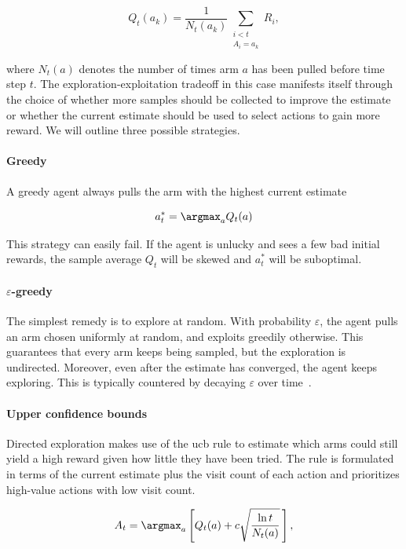 \begin{equation}\label{eq:bandit-sample-average}
  Q_t(a_k)=\frac{1}{N_t(a_k)}\sum_{\substack{i<t\\A_i=a_k}}R_i,
\end{equation}

where $N_t(a)$ denotes the number of times arm $a$ has been pulled before time step $t$.
The exploration-exploitation tradeoff in this case manifests itself through the choice
of whether more samples should be collected to improve the estimate or whether
the current estimate should be used to select actions to gain more reward.
We will outline three possible strategies.

\paragraph{Greedy}

A greedy agent always pulls the arm with the highest current estimate

\[
  a_t^*=\argmax_{a} Q_t(a)
\]

This strategy can easily fail.
If the agent is unlucky and sees a few bad initial rewards, the sample average $Q_t$ will be skewed and $a_t^*$ will be suboptimal.

\paragraph{$\varepsilon$-greedy}
The simplest remedy is to explore at random.
With probability $\varepsilon$, the agent pulls an arm chosen uniformly at random, and exploits greedily otherwise.
This guarantees that every arm keeps being sampled, but the exploration is undirected.
Moreover, even after the estimate has converged, the agent keeps exploring.
This is typically countered by decaying $\varepsilon$ over time~\cite{sutton_reinforcement_2020}.

\paragraph{Upper confidence bounds}
Directed exploration makes use of the \gls{ucb} rule to estimate which arms
could still yield a high reward given how little they have been tried.
The rule is formulated in terms of the current estimate plus the visit count of each action
and prioritizes high-value actions with low visit count.

\begin{equation}\label{eq:ucb}
  A_t=\argmax_a\left[Q_t(a)+c\sqrt{\frac{\ln t}{N_t(a)}}\,\right],
\end{equation}

